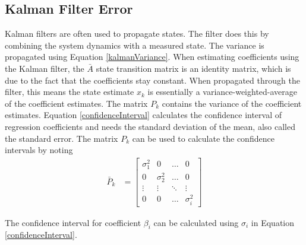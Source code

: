 \subsection*{Kalman Filter Error}
Kalman filters are often used to propagate states. The filter does this by combining the system dynamics with a measured state. The variance is propagated using Equation \ref{kalmanVariance}. When estimating coefficients using the Kalman filter, the $\bar{A}$ state transition matrix is an identity matrix, which is due to the fact that the coefficients stay constant. When propagated through the filter, this means the state estimate $x_k$ is essentially a variance-weighted-average of the coefficient estimates. The matrix $P_k$ contains the variance of the coefficient estimates. Equation \ref{confidenceInterval} calculates the confidence interval of regression coefficients and needs the standard deviation of the mean, also called the standard error. The matrix $P_k$ can be used  to calculate the confidence intervals by noting
\begin{align}
\bar{P}_k &= \begin{bmatrix}
\sigma_{1}^2 &  0  & \ldots & 0\\
0  &  \sigma_{2}^2 & \ldots & 0\\
\vdots & \vdots & \ddots & \vdots\\
0  &   0       &\ldots & \sigma_i^2
\end{bmatrix}
\end{align}

The confidence interval for coefficient $\beta_i$ can be calculated using $\sigma_i$ in Equation \ref{confidenceInterval}.
